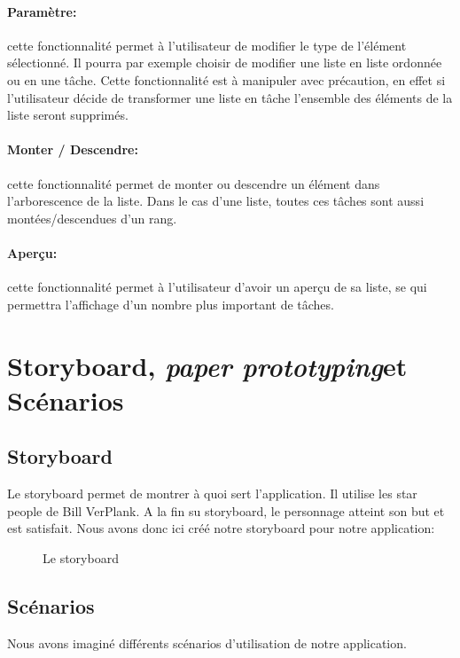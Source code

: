 \documentclass[a4paper,10pt]{article}
\newcommand{\paperPrototyping}{\emph{paper prototyping}}
\begin{document}
\paragraph{Paramètre:} cette fonctionnalité permet à l'utilisateur de modifier le type de l'élément sélectionné. Il pourra par exemple choisir de modifier une liste en liste ordonnée ou en une tâche. Cette fonctionnalité est à manipuler avec précaution, en effet si l'utilisateur décide de transformer une liste en tâche l'ensemble des éléments de la liste seront supprimés. %
\paragraph{Monter / Descendre:} cette fonctionnalité permet de monter ou descendre un élément dans l'arborescence de la liste. Dans le cas d'une liste, toutes ces tâches sont aussi montées/descendues d'un rang. %
\paragraph{Aperçu:} cette fonctionnalité permet à l'utilisateur d'avoir un aperçu de sa liste, se qui permettra l'affichage d'un nombre plus important de tâches. %

\newpage
\section{Storyboard, \paperPrototyping et Scénarios}

\subsection{Storyboard}
Le storyboard permet de montrer à quoi sert l'application. Il utilise les star people de Bill VerPlank. A la fin su storyboard, le personnage atteint son but et
est satisfait. Nous avons donc ici créé notre storyboard pour notre application:
\begin{figure}[H]
    \center
    \caption{Le storyboard}
\end{figure}

\subsection{Scénarios}
Nous avons imaginé différents scénarios d'utilisation de notre application.
\end{document}
